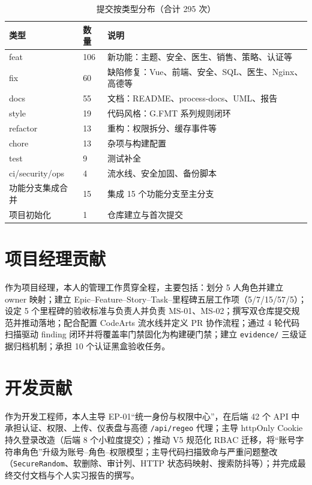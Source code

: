 \documentclass[UTF8,a4paper,12pt,openany,fontset=windows]{ctexrep}
\begin{document}
\begin{table}[H]
  \centering
  \caption{提交按类型分布（合计 295 次）}\label{tab:commit-type}
  \begin{tabularx}{\textwidth}{p{2.4cm}p{1.6cm}L}
    \toprule
    类型 & 数量 & 说明 \\
    \midrule
    feat & 106 & 新功能：主题、安全、医生、销售、策略、认证等 \\
    fix & 60 & 缺陷修复：Vue、前端、安全、SQL、医生、Nginx、高德等 \\
    docs & 55 & 文档：README、process-docs、UML、报告 \\
    style & 19 & 代码风格：G.FMT 系列规则闭环 \\
    refactor & 13 & 重构：权限拆分、缓存事件等 \\
    chore & 13 & 杂项与构建配置 \\
    test & 9 & 测试补全 \\
    ci/security/ops & 4 & 流水线、安全加固、备份脚本 \\
    功能分支集成合并 & 15 & 集成 15 个功能分支至主分支 \\
    项目初始化 & 1 & 仓库建立与首次提交 \\
    \bottomrule
  \end{tabularx}
\end{table}

\section{项目经理贡献}
作为项目经理，本人的管理工作贯穿全程，主要包括：划分 5 人角色并建立 owner 映射；建立 Epic--Feature--Story--Task--里程碑五层工作项（5/7/15/57/5）；设定 5 个里程碑的验收标准与负责人并负责 MS-01、MS-02；撰写双仓库提交规范并推动落地；配合配置 CodeArts 流水线并定义 PR 协作流程；通过 4 轮代码扫描驱动 finding 闭环并将覆盖率门禁固化为构建硬门禁；建立 \texttt{evidence/} 三级证据归档机制；承担 10 个认证黑盒验收任务。

\section{开发贡献}
作为开发工程师，本人主导 EP-01“统一身份与权限中心”，在后端 42 个 API 中承担认证、权限、上传、仪表盘与高德 \texttt{/api/regeo} 代理；主导 httpOnly Cookie 持久登录改造（后端 8 个小粒度提交）；推动 V5 规范化 RBAC 迁移，将“账号字符串角色”升级为账号--角色--权限模型；主导代码扫描致命与严重问题整改（\texttt{SecureRandom}、软删除、审计列、HTTP 状态码映射、搜索防抖等）；并完成最终交付文档与个人实习报告的撰写。
\end{document}
